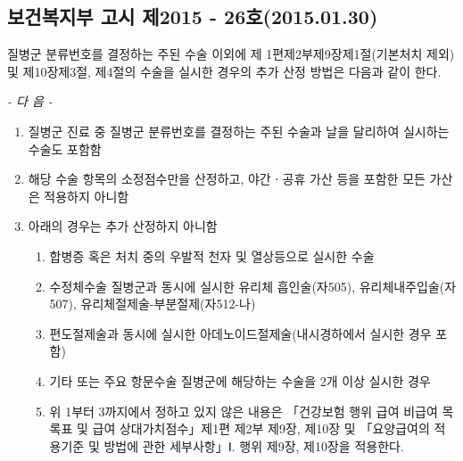 \subsection{보건복지부 고시 제2015 - 26호(2015.01.30)}
질병군 분류번호를 결정하는 주된 수술 이외에 제 1편제2부제9장제1절(기본처치 제외) 및 제10장제3절, 제4절의 수술을 실시한 경우의 추가 산정 방법은 다음과 같이 한다.\par
\begin{center}\emph{- 다 음 -}\end{center}
\begin{enumerate}[1.]\tightlist
\item 질병군 진료 중 질병군 분류번호를 결정하는 주된 수술과 날을 달리하여 실시하는 수술도 포함함
\item 해당 수술 항목의 소정점수만을 산정하고, 야간ㆍ공휴 가산 등을 포함한 모든 가산은 적용하지 아니함
\item 아래의 경우는 추가 산정하지 아니함
	\begin{enumerate}[가.]\tightlist
	\item 합병증 혹은 처치 중의 우발적 천자 및 열상등으로 실시한 수술
	\item 수정체수술 질병군과 동시에 실시한 유리체 흡인술(자505), 유리체내주입술(자507), 유리체절제술-부분절제(자512-나)
	\item 편도절제술과 동시에 실시한 아데노이드절제술(내시경하에서 실시한 경우 포함)
	\item 기타 또는 주요 항문수술 질병군에 해당하는 수술을 2개 이상 실시한 경우
	\item 위 1부터 3까지에서 정하고 있지 않은 내용은 「건강보험 행위 급여 비급여 목록표 및 급여 상대가치점수」제1편 제2부 제9장, 제10장 및 「요양급여의 적용기준 및 방법에 관한 세부사항」Ⅰ. 행위 제9장, 제10장을 적용한다.
	\end{enumerate}
\end{enumerate}